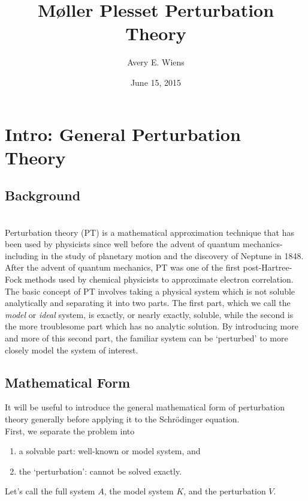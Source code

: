 \documentclass{article}
\title{M{\o}ller Plesset Perturbation Theory}
\author{Avery E. Wiens}
\date{June 15, 2015}
\newcommand{\vsp}{\vspace{0.2cm}}
\begin{document}
\maketitle
\tableofcontents
\newpage

\section{Intro: General Perturbation Theory}

\subsection{Background}

\noindent \\
Perturbation theory (PT) is a mathematical approximation technique that has been used by physicists since well before the advent of quantum mechanics- including in the study of planetary motion and the discovery of Neptune in 1848. After the advent of quantum mechanics, PT was one of the first post-Hartree-Fock methods used by chemical physicists to approximate electron correlation. \\[1ex]

\noindent 
The basic concept of PT involves taking a physical system which is not soluble analytically and separating it into two parts. The first part, which we call the {\it model} or {\it ideal} system, is exactly, or nearly exactly, soluble, while the second is the more troublesome part which has no analytic solution. By introducing more and more of this second part, the familiar system can be `perturbed' to more closely model the system of interest.

\subsection{Mathematical Form}
It will be useful to introduce the general mathematical form of perturbation theory generally before applying it to the Schr{\"o}dinger equation. \vsp \\
First, we separate the problem into
\begin{enumerate}
\item a solvable part: well-known or model system, and
\item the `perturbation': cannot be solved exactly. 
\end{enumerate}
Let's call the full system $A$, the model system $K$, and the perturbation $V$.
\end{document}
